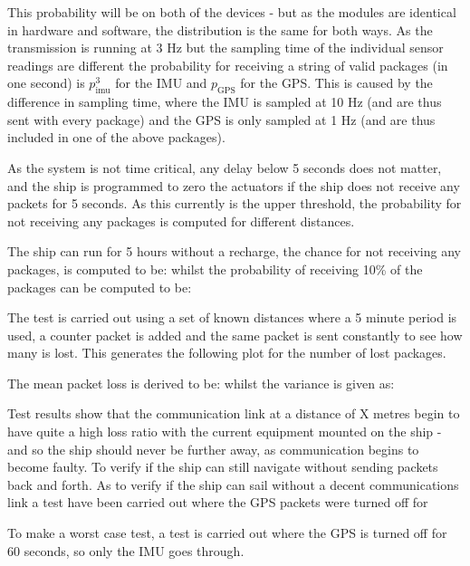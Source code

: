 This probability will be on both of the devices - but as the modules are identical in hardware and software, the distribution is the same for both ways. As the transmission is running at 3 Hz but the sampling time of the individual sensor readings are different the probability for receiving a string of valid packages (in one second) is $p_\text{imu}^{3}$ for the IMU and $p_\text{GPS}$ for the GPS. This is caused by the difference in sampling time, where the IMU is sampled at 10 Hz (and are thus sent with every package) and the GPS is only sampled at 1 Hz (and are thus included in one of the above packages). 

As the system is not time critical, any delay below 5 seconds does not matter, and the ship is programmed to zero the actuators if the ship does not receive any packets for 5 seconds. As this currently is the upper threshold, the probability for not receiving any packages is computed for different distances. 

The ship can run for 5 hours without a recharge, the chance for not receiving any packages, is computed to be: whilst the probability of receiving 10\% of the packages can be computed to be:

The test is carried out using a set of known distances where a 5 minute period is used, a counter packet is added and the same packet is sent constantly to see how many is lost. This generates the following plot for the number of lost packages. 

The mean packet loss is derived to be: whilst the variance is given as: 

Test results show that the communication link at a distance of X metres begin to have quite a high loss ratio with the current equipment mounted on the ship - and so the ship should never be further away, as communication begins to become faulty. To verify if the ship can still navigate without sending packets back and forth. As to verify if the ship can sail without a decent communications link a test have been carried out where the GPS packets were turned off for 

To make a worst case test, a test is carried out where the GPS is turned off for 60 seconds, so only the IMU goes through. 